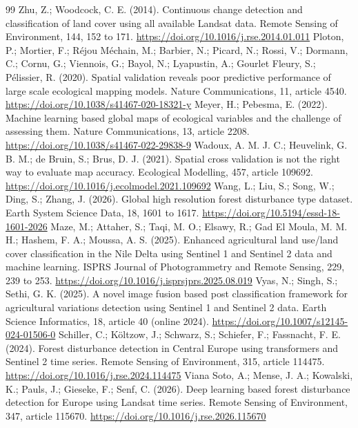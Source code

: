 \documentclass[10pt,a4paper,twocolumn]{article}
\begin{document}
\begin{thebibliography}{99}
 Zhu, Z.; Woodcock, C. E. (2014). Continuous change detection and classification of land cover using all available Landsat data. Remote Sensing of Environment, 144, 152 to 171. \url{https://doi.org/10.1016/j.rse.2014.01.011}
 Ploton, P.; Mortier, F.; Réjou Méchain, M.; Barbier, N.; Picard, N.; Rossi, V.; Dormann, C.; Cornu, G.; Viennois, G.; Bayol, N.; Lyapustin, A.; Gourlet Fleury, S.; Pélissier, R. (2020). Spatial validation reveals poor predictive performance of large scale ecological mapping models. Nature Communications, 11, article 4540. \url{https://doi.org/10.1038/s41467-020-18321-y}
 Meyer, H.; Pebesma, E. (2022). Machine learning based global maps of ecological variables and the challenge of assessing them. Nature Communications, 13, article 2208. \url{https://doi.org/10.1038/s41467-022-29838-9}
 Wadoux, A. M. J. C.; Heuvelink, G. B. M.; de Bruin, S.; Brus, D. J. (2021). Spatial cross validation is not the right way to evaluate map accuracy. Ecological Modelling, 457, article 109692. \url{https://doi.org/10.1016/j.ecolmodel.2021.109692}
 Wang, L.; Liu, S.; Song, W.; Ding, S.; Zhang, J. (2026). Global high resolution forest disturbance type dataset. Earth System Science Data, 18, 1601 to 1617. \url{https://doi.org/10.5194/essd-18-1601-2026}
 Maze, M.; Attaher, S.; Taqi, M. O.; Elsawy, R.; Gad El Moula, M. M. H.; Hashem, F. A.; Moussa, A. S. (2025). Enhanced agricultural land use/land cover classification in the Nile Delta using Sentinel 1 and Sentinel 2 data and machine learning. ISPRS Journal of Photogrammetry and Remote Sensing, 229, 239 to 253. \url{https://doi.org/10.1016/j.isprsjprs.2025.08.019}
 Vyas, N.; Singh, S.; Sethi, G. K. (2025). A novel image fusion based post classification framework for agricultural variations detection using Sentinel 1 and Sentinel 2 data. Earth Science Informatics, 18, article 40 (online 2024). \url{https://doi.org/10.1007/s12145-024-01506-0}
 Schiller, C.; Költzow, J.; Schwarz, S.; Schiefer, F.; Fassnacht, F. E. (2024). Forest disturbance detection in Central Europe using transformers and Sentinel 2 time series. Remote Sensing of Environment, 315, article 114475. \url{https://doi.org/10.1016/j.rse.2024.114475}
 Viana Soto, A.; Mense, J. A.; Kowalski, K.; Pauls, J.; Gieseke, F.; Senf, C. (2026). Deep learning based forest disturbance detection for Europe using Landsat time series. Remote Sensing of Environment, 347, article 115670. \url{https://doi.org/10.1016/j.rse.2026.115670}

\end{thebibliography}
\end{document}
